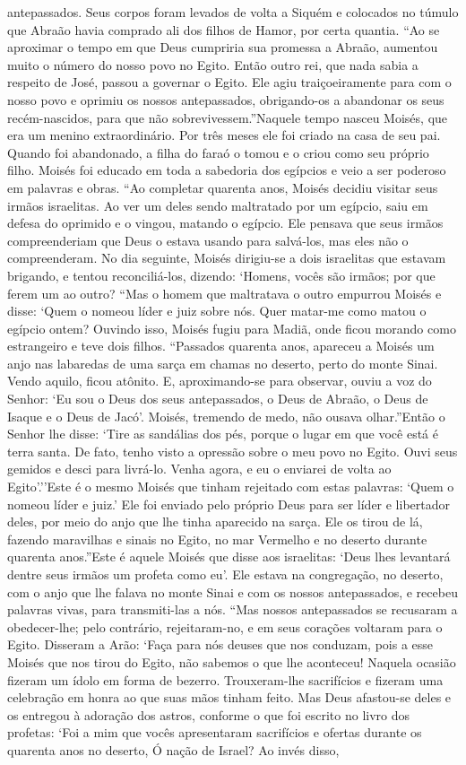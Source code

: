 \documentclass[
]{book}
\begin{document}
antepassados. Seus corpos foram levados de volta a Siquém e colocados no túmulo que Abraão havia comprado ali dos filhos de Hamor, por certa quantia. ``Ao se aproximar o tempo em que Deus cumpriria sua promessa a Abraão, aumentou muito o número do nosso povo no Egito. Então outro rei, que nada sabia a respeito de José, passou a governar o Egito. Ele agiu traiçoeiramente para com o nosso povo e oprimiu os nossos antepassados, obrigando-os a abandonar os seus recém-nascidos, para que não sobrevivessem.''Naquele tempo nasceu Moisés, que era um menino extraordinário. Por três meses ele foi criado na casa de seu pai. Quando foi abandonado, a filha do faraó o tomou e o criou como seu próprio filho. Moisés foi educado em toda a sabedoria dos egípcios e veio a ser poderoso em palavras e obras. ``Ao completar quarenta anos, Moisés decidiu visitar seus irmãos israelitas. Ao ver um deles sendo maltratado por um egípcio, saiu em defesa do oprimido e o vingou, matando o egípcio. Ele pensava que seus irmãos compreenderiam que Deus o estava usando para salvá-los, mas eles não o compreenderam. No dia seguinte, Moisés dirigiu-se a dois israelitas que estavam brigando, e tentou reconciliá-los, dizendo: `Homens, vocês são irmãos; por que ferem um ao outro? ``Mas o homem que maltratava o outro empurrou Moisés e disse: `Quem o nomeou líder e juiz sobre nós. Quer matar-me como matou o egípcio ontem? Ouvindo isso, Moisés fugiu para Madiã, onde ficou morando como estrangeiro e teve dois filhos. ``Passados quarenta anos, apareceu a Moisés um anjo nas labaredas de uma sarça em chamas no deserto, perto do monte Sinai. Vendo aquilo, ficou atônito. E, aproximando-se para observar, ouviu a voz do Senhor: `Eu sou o Deus dos seus antepassados, o Deus de Abraão, o Deus de Isaque e o Deus de Jacó'. Moisés, tremendo de medo, não ousava olhar.''Então o Senhor lhe disse: `Tire as sandálias dos pés, porque o lugar em que você está é terra santa. De fato, tenho visto a opressão sobre o meu povo no Egito. Ouvi seus gemidos e desci para livrá-lo. Venha agora, e eu o enviarei de volta ao Egito'.''Este é o mesmo Moisés que tinham rejeitado com estas palavras: `Quem o nomeou líder e juiz.' Ele foi enviado pelo próprio Deus para ser líder e libertador deles, por meio do anjo que lhe tinha aparecido na sarça. Ele os tirou de lá, fazendo maravilhas e sinais no Egito, no mar Vermelho e no deserto durante quarenta anos.''Este é aquele Moisés que disse aos israelitas: `Deus lhes levantará dentre seus irmãos um profeta como eu'. Ele estava na congregação, no deserto, com o anjo que lhe falava no monte Sinai e com os nossos antepassados, e recebeu palavras vivas, para transmiti-las a nós. ``Mas nossos antepassados se recusaram a obedecer-lhe; pelo contrário, rejeitaram-no, e em seus corações voltaram para o Egito. Disseram a Arão: `Faça para nós deuses que nos conduzam, pois a esse Moisés que nos tirou do Egito, não sabemos o que lhe aconteceu! Naquela ocasião fizeram um ídolo em forma de bezerro. Trouxeram-lhe sacrifícios e fizeram uma celebração em honra ao que suas mãos tinham feito. Mas Deus afastou-se deles e os entregou à adoração dos astros, conforme o que foi escrito no livro dos profetas: `Foi a mim que vocês apresentaram sacrifícios e ofertas durante os quarenta anos no deserto, Ó nação de Israel? Ao invés disso, 
\end{document}

